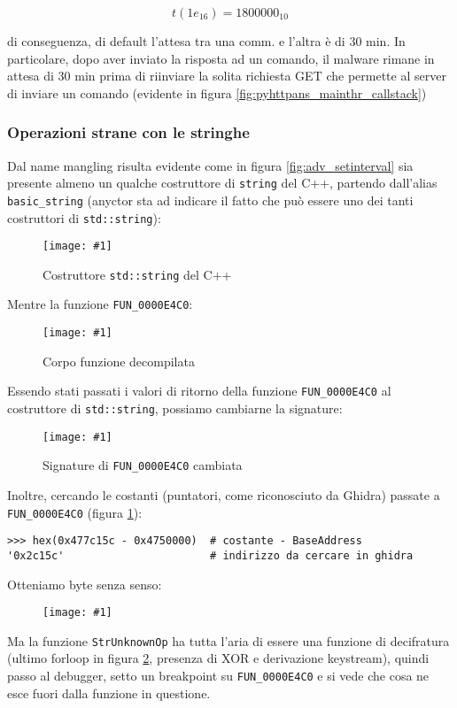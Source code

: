 \documentclass[
    a4paper, %
    11pt %
]{article}
\newcommand{\pic}[4]{\begin{figure}[H]
            \centering
            \texttt{[image: \#1]}
            \caption{#2}
            \label{fig:#1}
            \end{figure}}
\begin{document}
            \begin{equation}
t(1e_{16}) = 1800000_{10}
            \end{equation}
            
            di conseguenza, di default l'attesa tra una comm. e l'altra è di 30 min. In particolare, dopo aver
            inviato la risposta ad un comando, il malware rimane in attesa di 30 min prima di riinviare la solita richiesta GET che permette al server di inviare un comando (evidente in figura \ref{fig:pyhttpans_mainthr_callstack})

            \subsubsection{Operazioni strane con le stringhe}

            Dal name mangling risulta evidente come in figura \ref{fig:adv_setinterval} sia presente almeno  un qualche costruttore di \texttt{string} del C++,
            partendo dall'alias \texttt{basic\_string} (anyctor sta ad indicare il fatto che può essere
            uno dei tanti costruttori di \texttt{std::string}):
            \pic{adv_stds}{Costruttore \texttt{std::string} del C++}{9cm}{3cm}

            Mentre la funzione \texttt{FUN\_0000E4C0}:
            \pic{adv_seems_encfn}{Corpo funzione decompilata}{16cm}{10cm}

            Essendo stati passati i valori di ritorno della funzione \texttt{FUN\_0000E4C0} al costruttore di
            \texttt{std::string}, possiamo cambiarne la signature:

            \pic{adv_strunk}{Signature di \texttt{FUN\_0000E4C0} cambiata}{13cm}{3cm}

            Inoltre, cercando le costanti (puntatori, come riconosciuto da Ghidra) passate a \texttt{FUN\_0000E4C0} (figura \ref{fig:adv_stds}):

            \begin{lstlisting}
>>> hex(0x477c15c - 0x4750000)  # costante - BaseAddress
'0x2c15c'                       # indirizzo da cercare in ghidra
            \end{lstlisting}

            Otteniamo byte senza senso:

            \pic{adv_nonsensestr}{}{10cm}{8cm}

            Ma la funzione \texttt{StrUnknownOp} ha tutta l'aria di essere una funzione di decifratura
            (ultimo forloop in figura \ref{fig:adv_seems_encfn}, presenza di XOR e derivazione keystream),
            quindi passo al debugger, setto un breakpoint su \texttt{FUN\_0000E4C0} e si vede che cosa ne esce fuori dalla funzione in
            questione.
\end{document}
